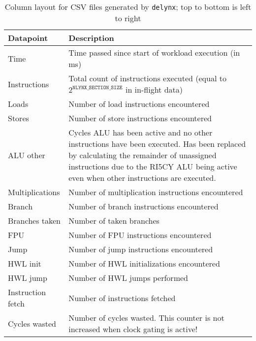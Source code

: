 \begin{table}
    \centering
    \caption{Column layout for CSV files generated by \texttt{delynx}; top to bottom is left to right}
    \begin{tabular}{lp{}}
        \textbf{Datapoint}  & \textbf{Description} \\
        \hline
        Time            & Time passed since start of workload execution (in ms) \\
        Instructions    & Total count of instructions executed (equal to $2^{\texttt{NLYNX\_SECTION\_SIZE}}$ in in-flight data) \\
        Loads           & Number of load instructions encountered \\
        Stores          & Number of store instructions encountered \\
        ALU other       & Cycles ALU has been active and no other instructions have been executed. Has been replaced by calculating the remainder of unassigned instructions due to the RI5CY ALU being active even when other instructions are executed. \\
        Multiplications & Number of multiplication instructions encountered \\
        Branch          & Number of branch instructions encountered \\
        Branches taken  & Number of taken branches \\
        FPU             & Number of FPU instructions encountered \\
        Jump            & Number of jump instructions encountered \\
        \ac{HWL} init   & Number of \ac{HWL} initializations encountered \\
        \ac{HWL} jump   & Number of \ac{HWL} jumps performed \\
        Instruction fetch   & Number of instructions fetched \\
        Cycles wasted   & Number of cycles wasted. This counter is not increased when clock gating is active! \\
    \end{tabular}
    \label{tab:howto/datalayout}
\end{table}